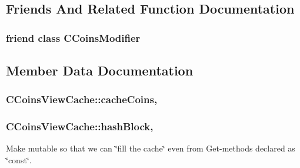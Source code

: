 \subsection{Friends And Related Function Documentation}
\hypertarget{class_c_coins_view_cache_ae6ce8219acb79950bced74cb108acacf}{}
\subsubsection[{C\+Coins\+Modifier}]{\setlength{\rightskip}{0pt plus 5cm}friend class {\bf C\+Coins\+Modifier}\hspace{0.3cm}{\ttfamily [friend]}}\label{class_c_coins_view_cache_ae6ce8219acb79950bced74cb108acacf}


\subsection{Member Data Documentation}
\hypertarget{class_c_coins_view_cache_af33cc2c6d38af65ac833d4d13c8e3764}{}
\subsubsection[{cache\+Coins}]{ C\+Coins\+View\+Cache\+::cache\+Coins\hspace{0.3cm}{\ttfamily [mutable]}, {\ttfamily [protected]}}\label{class_c_coins_view_cache_af33cc2c6d38af65ac833d4d13c8e3764}
\hypertarget{class_c_coins_view_cache_a229dddddbc5501edc250209a2ce5df8b}{}
\subsubsection[{hash\+Block}]{ C\+Coins\+View\+Cache\+::hash\+Block\hspace{0.3cm}{\ttfamily [mutable]}, {\ttfamily [protected]}}\label{class_c_coins_view_cache_a229dddddbc5501edc250209a2ce5df8b}
Make mutable so that we can \char`\"{}fill the cache\char`\"{} even from Get-\/methods declared as \char`\"{}const\char`\"{}. \hypertarget{class_c_coins_view_cache_a363e27234d36bb0fc533d60cd64d1bc3}{}
